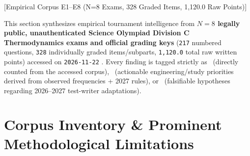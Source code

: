 [Empirical Corpus E1--E8 (N=8 Exams, 328 Graded Items, 1,120.0 Raw Points)]


This section synthesizes empirical tournament intelligence from \textbf{$N = 8$ legally public, unauthenticated Science Olympiad Division C Thermodynamics exams and official grading keys} (\texttt{217} numbered questions, \texttt{328} individually graded items/subparts, \texttt{1,120.0} total raw written points) accessed on \texttt{2026-11-22} . Every finding is tagged strictly as \OBS\ (directly counted from the accessed corpus), \REC\ (actionable engineering/study priorities derived from observed frequencies + 2027 rules), or \SPEC\ (falsifiable hypotheses regarding 2026--2027 test-writer adaptations).

\section{Corpus Inventory \& Prominent Methodological Limitations}\label{sec:22.1}

